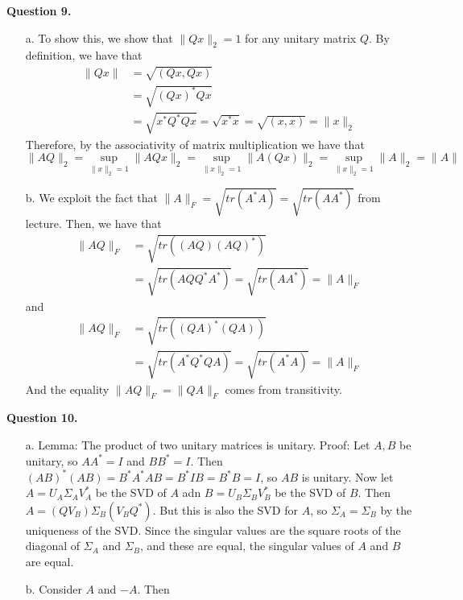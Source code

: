 \documentclass{article}
\begin{document}
\textbf{Question 9.} \\
\begin{itemize}
    \item[a.] To show this, we show that $\|Qx\|_2=1$ for any unitary matrix $Q$. By definition, we have that 
    \begin{align*}
        \|Qx\| &= \sqrt{(Qx, Qx)}\\
        &= \sqrt{(Qx)^*Qx}\\
        &=\sqrt{x^*Q^*Qx}=\sqrt{x^*x}=\sqrt{(x, x)} = \|x\|_2
    \end{align*} 
    Therefore, by the associativity of matrix multiplication we have that 
    \begin{equation*}
        \|AQ\|_2 = \sup_{\|x\|_2=1}\|AQx\|_2 =\sup_{\|x\|_2=1}\|A(Qx)\|_2= \sup_{\|x\|_2=1}\|A\|_2 = \|A\|
    \end{equation*}
    \item[b.] We exploit the fact that $\|A\|_F = \sqrt{tr(A^*A)}=\sqrt{tr(AA^*)}$ from lecture. Then, we have that 
    \begin{align*}
        \|AQ\|_F &= \sqrt{tr((AQ)(AQ)^*)}\\
        &=\sqrt{tr(AQQ^*A^*)}=\sqrt{tr(AA^*)}=\|A\|_F
    \end{align*} 
    and 
    \begin{align*}
        \|AQ\|_F &= \sqrt{tr((QA)^*(QA))}\\
        &=\sqrt{tr(A^*Q^*QA)}= \sqrt{tr(A^*A)}=\|A\|_F
    \end{align*}
    And the equality $\|AQ\|_F = \|QA\|_F$ comes from transitivity. 
\end{itemize}

\textbf{Question 10.}
\begin{itemize}
    \item[a.] Lemma: The product of two unitary matrices is unitary. Proof: Let $A, B$ be unitary, so $AA^*=I$ and $BB^*=I$. Then $(AB)^*(AB) = B^*A^*AB = B^*IB = B^*B = I$, so $AB$ is unitary. Now let $A=U_A\Sigma_A V_A^*$ be the SVD of $A$ adn $B=U_B\Sigma_B V_B^*$ be the SVD of $B$. Then $A=(QV_B)\Sigma_B(V_BQ^*)$. But this is also the SVD for $A$, so $\Sigma_A = \Sigma_B$ by the uniqueness of the SVD. Since the singular values are the square roots of the diagonal of $\Sigma_A$ and $\Sigma_B$, and these are equal, the singular values of $A$ and $B$ are equal. 
    \item[b.] Consider $A$ and $-A$. Then 
\end{itemize}
\end{document}
